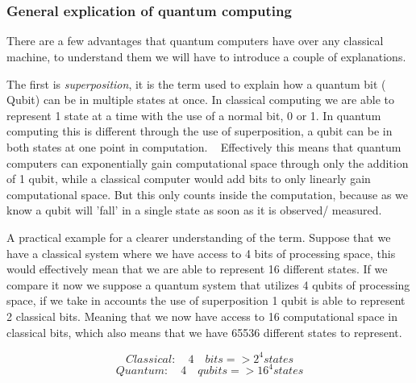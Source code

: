 \chapter{}
\label{ch:stand-van-zaken}



\subsection{General explication of quantum computing}

There are a few advantages that quantum computers have over any classical machine, to understand them we will have to introduce a couple of explanations.

The first is \emph{superposition}, it is the term used to explain how a quantum bit ( Qubit) can be in multiple states at once. In classical computing we are able to represent 1 state at a time with the use of a normal bit, 0 or 1. In quantum computing this is different through the use of superposition, a qubit can be in both states at one point in computation. ~\autocite{Shor2000} Effectively this means that quantum computers can exponentially gain computational space through only the addition of 1 qubit, while a classical computer would add bits to only linearly gain computational space. But this only counts inside the computation, because as we know a qubit will 'fall' in a single state as soon as it is observed/ measured. \autocite{Rieffel1998}

A practical example for a clearer understanding of the term. Suppose that we have a classical system where we have access to 4 bits of processing space, this would effectively mean that we are able to represent 16 different states. If we compare it now we suppose a quantum system that utilizes 4 qubits of processing space, if we take in accounts the use of superposition 1 qubit is able to represent 2 classical bits. Meaning that we now have access to 16 computational space in classical bits, which also means that we have 65536 different states to represent. 

\begin{equation}
Classical:\quad 4 \quad bits => 2^{4} states
\end{equation}
\begin{equation}
Quantum: \quad 4 \quad qubits => 16^{4} states
\end{equation}

